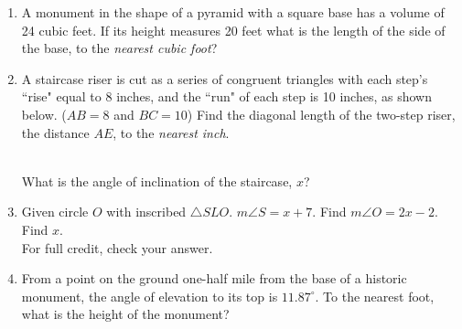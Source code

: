 \documentclass[12pt, twoside]{article}
\begin{document}
\begin{enumerate}
  \item A monument in the shape of a pyramid with a square base has a volume of 24 cubic feet. If its height measures 20 feet what is the length of the side of the base, to the \emph{nearest cubic foot}? \vspace{3.5cm}


  \item A staircase riser is cut as a series of congruent triangles with each step's ``rise" equal to 8 inches, and the ``run" of each step is 10 inches, as shown below. ($AB=8$ and $BC=10$) Find the diagonal length of the two-step riser, the distance $AE$, to the \emph{nearest inch}.\\[0.5cm]
        \\
      What is the angle of inclination of the staircase, $x$?

   \item Given circle $O$ with inscribed $\triangle SLO$. $m\angle S=x+7$. Find $m\angle O=2x-2$. Find $x$.\\
   For full credit, check your answer.\\[1cm]

\newpage
   \item From a point on the ground one-half mile from the base of a historic monument, the angle of elevation to its top is $11.87^\circ$. To the nearest foot, what is the height of the monument?\\[1cm]
     \vspace{3cm}


\end{enumerate}
\end{document}
